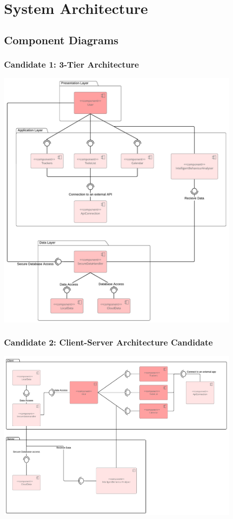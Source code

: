 \documentclass[a4paper,11pt]{article} %
\begin{document}
\section{System Architecture}
\subsection{Component Diagrams}
\subsubsection{Candidate 1: 3-Tier Architecture}
\vspace{1cm}
\begin{center}
    \includegraphics[width=0.9\textwidth]{img/Component_Diagram_3tier.pdf}
\end{center}
\newpage
\subsubsection{Candidate 2: Client-Server Architecture Candidate}
\begin{center}
    \includegraphics[width=0.9\textwidth]{img/Component_Diagram_SC.pdf}
\end{center}
\ 
\end{document}
